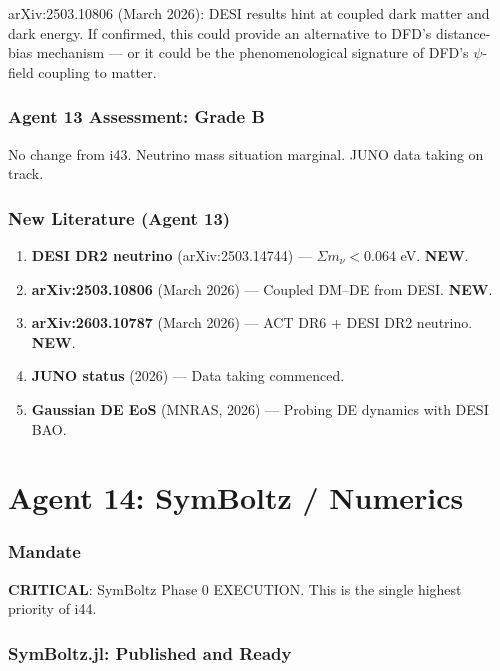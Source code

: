 \documentclass[11pt,a4paper]{article}
\newcommand{\NEW}{\textcolor{dfdblue}{\textbf{NEW}}}
\begin{document}
arXiv:2503.10806 (March 2026): DESI results hint at coupled dark matter and dark energy. If confirmed, this could provide an alternative to DFD's distance-bias mechanism --- or it could be the phenomenological signature of DFD's $\psi$-field coupling to matter.

\section{Agent 13 Assessment: Grade B}

No change from i43. Neutrino mass situation marginal. JUNO data taking on track.

\section{New Literature (Agent 13)}

\begin{enumerate}
\item \textbf{DESI DR2 neutrino} (arXiv:2503.14744) --- $\Sigma m_\nu < 0.064$ eV. \NEW.
\item \textbf{arXiv:2503.10806} (March 2026) --- Coupled DM--DE from DESI. \NEW.
\item \textbf{arXiv:2603.10787} (March 2026) --- ACT DR6 + DESI DR2 neutrino. \NEW.
\item \textbf{JUNO status} (2026) --- Data taking commenced.
\item \textbf{Gaussian DE EoS} (MNRAS, 2026) --- Probing DE dynamics with DESI BAO.
\end{enumerate}


\part{Agent 14: SymBoltz / Numerics}
\label{part:agent14}

\section{Mandate}

\textbf{CRITICAL}: SymBoltz Phase 0 EXECUTION. This is the single highest priority of i44.

\section{SymBoltz.jl: Published and Ready}
\end{document}
